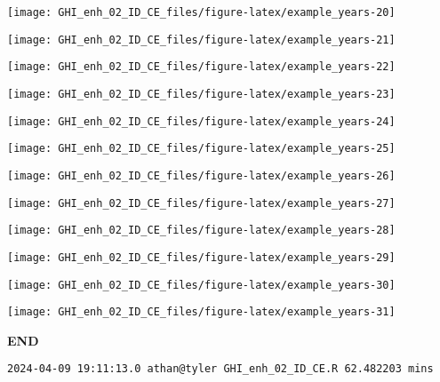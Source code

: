 \documentclass[
  10pt,
  a4paper,oneside]{article}
\begin{document}
\begin{center}\texttt{[image: GHI\_enh\_02\_ID\_CE\_files/figure-latex/example\_years-20]} \end{center}

\begin{center}\texttt{[image: GHI\_enh\_02\_ID\_CE\_files/figure-latex/example\_years-21]} \end{center}

\begin{center}\texttt{[image: GHI\_enh\_02\_ID\_CE\_files/figure-latex/example\_years-22]} \end{center}

\begin{center}\texttt{[image: GHI\_enh\_02\_ID\_CE\_files/figure-latex/example\_years-23]} \end{center}

\begin{center}\texttt{[image: GHI\_enh\_02\_ID\_CE\_files/figure-latex/example\_years-24]} \end{center}

\begin{center}\texttt{[image: GHI\_enh\_02\_ID\_CE\_files/figure-latex/example\_years-25]} \end{center}

\begin{center}\texttt{[image: GHI\_enh\_02\_ID\_CE\_files/figure-latex/example\_years-26]} \end{center}

\begin{center}\texttt{[image: GHI\_enh\_02\_ID\_CE\_files/figure-latex/example\_years-27]} \end{center}

\begin{center}\texttt{[image: GHI\_enh\_02\_ID\_CE\_files/figure-latex/example\_years-28]} \end{center}

\begin{center}\texttt{[image: GHI\_enh\_02\_ID\_CE\_files/figure-latex/example\_years-29]} \end{center}

\begin{center}\texttt{[image: GHI\_enh\_02\_ID\_CE\_files/figure-latex/example\_years-30]} \end{center}

\begin{center}\texttt{[image: GHI\_enh\_02\_ID\_CE\_files/figure-latex/example\_years-31]} \end{center}

\textbf{END}

\begin{verbatim}
2024-04-09 19:11:13.0 athan@tyler GHI_enh_02_ID_CE.R 62.482203 mins
\end{verbatim}
\end{document}
